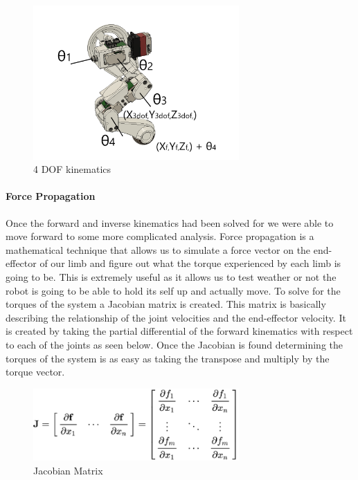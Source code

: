             \begin{figure}[H]
                    \centering
                    \includegraphics[width=0.7\textwidth]{figures/4dofkinematics.png}
                    \caption{4 DOF kinematics}
                    \label{fig:4dofkinematics}
                \end{figure}  
                
             \paragraph{Force Propagation} Once the forward and inverse kinematics had been solved for we were able to move forward to some more complicated analysis. Force propagation is a mathematical technique that allows us to simulate a force vector on the end-effector of our limb and figure out what the torque experienced by each limb is going to be. This is extremely useful as it allows us to test weather or not the robot is going to be able to hold its self up and actually move. To solve for the torques of the system a Jacobian matrix is created. This matrix is basically describing the relationship of the joint velocities and the end-effector velocity. It is created by taking the partial differential of the forward kinematics with respect to each of the joints as seen below. Once the Jacobian is found determining the torques of the system is as easy as taking the transpose and multiply by the torque vector. 
             
             \begin{figure}[H]
                    \centering
                    \includegraphics[width=0.7\textwidth]{figures/JacobianMatrix.png}
                    \caption{Jacobian Matrix \cite{wikipedia_2019} }
                    \label{fig:JacobianMatrix}
                \end{figure}  
             
